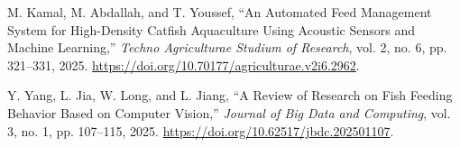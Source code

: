 \documentclass[11pt,a4paper]{article}
\begin{document}
{\begin{enumerate}[label={[\arabic*]}, leftmargin=2em]
    \item M. Kamal, M. Abdallah, and T. Youssef, ``An Automated Feed Management System for High-Density Catfish Aquaculture Using Acoustic Sensors and Machine Learning,'' \textit{Techno Agriculturae Studium of Research}, vol. 2, no. 6, pp. 321--331, 2025. \url{https://doi.org/10.70177/agriculturae.v2i6.2962}.
    \item Y. Yang, L. Jia, W. Long, and L. Jiang, ``A Review of Research on Fish Feeding Behavior Based on Computer Vision,'' \textit{Journal of Big Data and Computing}, vol. 3, no. 1, pp. 107--115, 2025. \url{https://doi.org/10.62517/jbdc.202501107}.
\end{enumerate}
}
\end{document}
